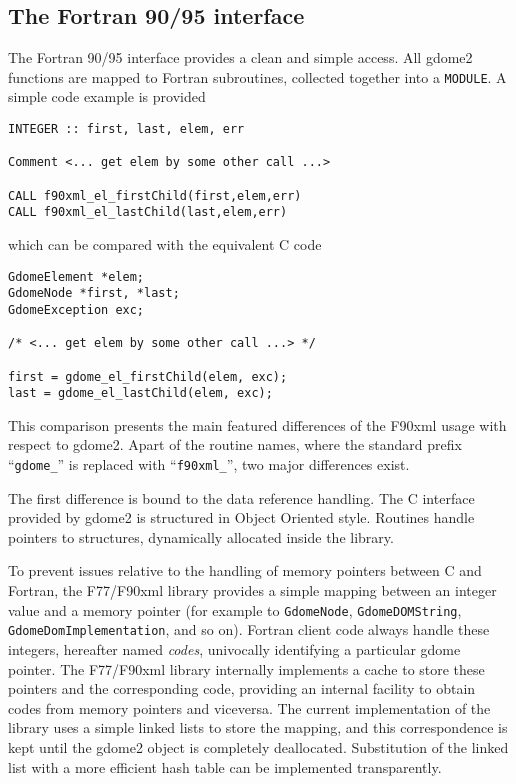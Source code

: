 \subsection*{The Fortran 90/95 interface}

The Fortran 90/95 interface provides a clean and simple access. All gdome2
functions are mapped to Fortran subroutines, collected together into a 
\texttt{MODULE}. A simple code example is provided 

{
\footnotesize
\begin{verbatim}
INTEGER :: first, last, elem, err

Comment <... get elem by some other call ...>

CALL f90xml_el_firstChild(first,elem,err)
CALL f90xml_el_lastChild(last,elem,err)
\end{verbatim}
}

which can be compared with the equivalent C code

{
\footnotesize
\begin{verbatim}
GdomeElement *elem;
GdomeNode *first, *last;
GdomeException exc;

/* <... get elem by some other call ...> */

first = gdome_el_firstChild(elem, exc);
last = gdome_el_lastChild(elem, exc);
\end{verbatim}
}

This comparison presents the main featured differences of the F90xml usage
with respect to gdome2. Apart of the routine names, where the standard
prefix ``\texttt{gdome\_}'' is replaced with ``\texttt{f90xml\_}'', two
major differences exist. 

The first difference is bound to the data reference handling.  The C
interface provided by gdome2 is structured in {Object Oriented} style.
Routines handle pointers to structures, dynamically allocated inside the
library. 

To prevent issues relative to the handling of memory pointers
between C and Fortran, the F77/F90xml library provides a simple mapping
between an integer value and a memory pointer (for example to
\texttt{GdomeNode}, \texttt{GdomeDOMString},
\texttt{GdomeDomImplementation}, and so on).  Fortran client code always
handle these integers, hereafter named
\textit{codes}, univocally identifying a particular gdome pointer.  The
F77/F90xml library internally implements a cache to store these pointers and
the corresponding code, providing an internal facility to obtain codes from
memory pointers and viceversa.  The current implementation of the library
uses a simple linked lists to store the mapping, and this correspondence is
kept until the gdome2 object is completely deallocated.  Substitution of the
linked list with a more efficient hash table can be implemented
transparently.

